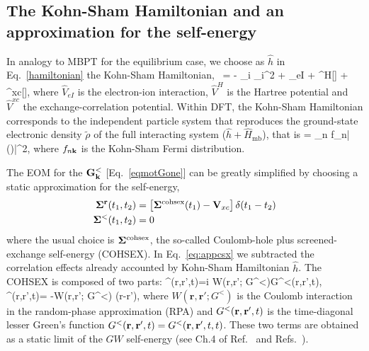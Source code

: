 \subsection{The Kohn-Sham Hamiltonian and an approximation for the self-energy}
\label{ss:KS-CHSX}

In analogy to MBPT for the equilibrium case,
we choose as $\hat{h}$ in Eq.~\eqref{hamiltonian} the Kohn-Sham Hamiltonian,~\cite{PhysRev.140.A1133} 
\be
{} = - \sum_i \nabla_i^2 + 
_{eI} + ^H[\tilde \rho]   + ^{xc}[\tilde \rho], \label{eq:kshamH}
\ee
where $\hat{V}_{eI}$ is the electron-ion interaction, 
$\hat{V}^H$ is the Hartree potential and
$\hat{V}^{xc}$ the exchange-correlation potential.
Within DFT, the Kohn-Sham Hamiltonian corresponds to the independent particle system
that reproduces the ground-state electronic density $\tilde \rho$ of
the full interacting system ($\hat h + \hat H_{\text{mb}}$), that is
\be
\tilde \rho = \sum_{n\kk} f_{n\kk}|\varphi(\rr)|^2,
\label{eq:KSden}
\ee
where $f_{n{\bf k}}$ is the Kohn-Sham Fermi distribution. 

The EOM for the ${\bf G}_{{\bf k}}^<$  [Eq.~\eqref{eqmotGone}] can be greatly simplified by choosing 
a static approximation for the self-energy,
\begin{subequations}
\begin{align}
{\bf\Sigma}^{{\bf r}} (t_1,t_2) & = \left[ {\bf\Sigma}^{\mathrm {cohsex}} (t_1) - {\bf V}_{xc} \right ] \delta(t_1 - t_2) \label{eq:appcsx}\\
{\bf\Sigma}^<(t_1,t_2) & =0 \label{eq:appret}
\end{align}
\end{subequations}
where the usual choice is ${\bf\Sigma}^{\mathrm {cohsex}}$, the so-called Coulomb-hole plus screened-exchange self-energy (COHSEX)\cite{PhysRevB.38.7530}. In Eq.~\ref{eq:appcsx} we subtracted the correlation effects already accounted by Kohn-Sham Hamiltonian $\hat{h}$.
The COHSEX is composed of two parts:
\bea
\Sigma^{}(\mathbf r,\mathbf r',t)=i W(\mathbf r,\mathbf r'; G^<)G^<(\mathbf r,\mathbf r',t), \\
\Sigma^{}(\mathbf r,\mathbf r',t)= -W(\mathbf r,\mathbf r'; G^<) \delta(\mathbf r-\mathbf r'),
\label{coh_anx_sex}
\eea
where $W(\mathbf r,\mathbf{r'}; G^<)$ is the Coulomb interaction in
the random-phase approximation (RPA) and $G^<({\bf r},{\bf r}',t)$ is the time-diagonal lesser Green's function $G^<({\bf r},{\bf r}',t)=G^<({\bf r},{\bf r}',t,t)$. These two terms are obtained as a
static limit of the $GW$ self-energy (see Ch.4 of Ref.~\cite{kremp} and
Refs.~\cite{PhysRevB.38.7530, PhysRevB.69.205204}). 

